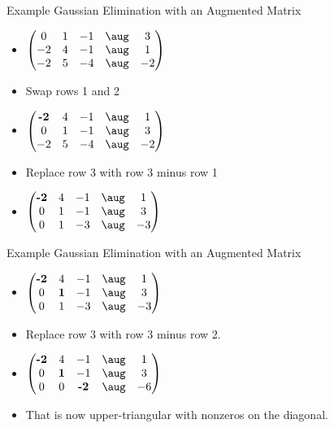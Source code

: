 \documentclass{beamer}
\begin{document}
\begin{frame}{Example Gaussian Elimination with an Augmented Matrix}

\begin{itemize}
\item $
\begin{pmatrix}
 0 & 1 & -1  &  \aug & 3  \\
-2 & 4 & -1  &  \aug & 1  \\
-2 & 5 & -4  &  \aug & -2  \\
\end{pmatrix}
$
\item Swap rows 1 and 2
\item $
\begin{pmatrix}
\textbf{-2} & 4 & -1  &  \aug & 1  \\
        0   & 1 & -1  &  \aug & 3  \\
        -2  & 5 & -4  &  \aug & -2  \\
\end{pmatrix}
$
\item Replace row 3 with row 3 minus row 1
\item $
\begin{pmatrix}
\textbf{-2} & 4 & -1  &  \aug & 1  \\
        0   & 1 & -1  &  \aug & 3  \\
        0   & 1 & -3  &  \aug & -3  \\
\end{pmatrix}
$
\end{itemize}
\end{frame}


\begin{frame}{Example Gaussian Elimination with an Augmented Matrix}

\begin{itemize}
\item $
\begin{pmatrix}
\textbf{-2} &         4  & -1  &  \aug & 1  \\
        0   & \textbf{1} & -1  &  \aug & 3  \\
        0   &         1  & -3  &  \aug & -3  \\
\end{pmatrix}
$
\item Replace row 3 with row 3 minus row 2.
\item $
\begin{pmatrix}
\textbf{-2} &         4  &          -1  &  \aug & 1  \\
        0   & \textbf{1} &          -1  &  \aug & 3  \\
        0   &         0  & \textbf{-2}  &  \aug & -6  \\
\end{pmatrix}
$
\item That is now upper-triangular with nonzeros on the diagonal.
\end{itemize}
\end{frame}
\end{document}
